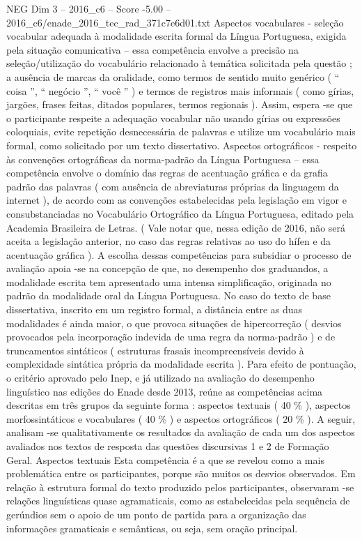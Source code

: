 \begin{textsample}{NEG Dim 3 – 2016\_c6 – Score -5.00 – 2016\_c6/enade\_2016\_tec\_rad\_371c7e6d01.txt}
Aspectos vocabulares - seleção vocabular adequada à modalidade escrita formal da Língua Portuguesa, exigida pela situação comunicativa – essa competência envolve a precisão na seleção/utilização do vocabulário relacionado à temática solicitada pela questão ; a ausência de marcas da oralidade, como termos de sentido muito genérico ( “ coisa ”, “ negócio ”, “ você ” ) e termos de registros mais informais ( como gírias, jargões, frases feitas, ditados populares, termos regionais ).
Assim, espera -se que o participante respeite a adequação vocabular não usando gírias ou expressões coloquiais, evite repetição desnecessária de palavras e utilize um vocabulário mais formal, como solicitado por um texto dissertativo.
Aspectos ortográficos - respeito às convenções ortográficas da norma-padrão da Língua Portuguesa – essa competência envolve o domínio das regras de acentuação gráfica e da grafia padrão das palavras ( com ausência de abreviaturas próprias da linguagem da internet ), de acordo com as convenções estabelecidas pela legislação em vigor e consubstanciadas no Vocabulário Ortográfico da Língua Portuguesa, editado pela Academia Brasileira de Letras. ( Vale notar que, nessa edição de 2016, não será aceita a legislação anterior, no caso das regras relativas ao uso do hífen e da acentuação gráfica ).
A escolha dessas competências para subsidiar o processo de avaliação apoia -se na concepção de que, no desempenho dos graduandos, a modalidade escrita tem apresentado uma intensa simplificação, originada no padrão da modalidade oral da Língua Portuguesa.
No caso do texto de base dissertativa, inscrito em um registro formal, a distância entre as duas modalidades é ainda maior, o que provoca situações de hipercorreção ( desvios provocados pela incorporação indevida de uma regra da norma-padrão ) e de truncamentos sintáticos ( estruturas frasais incompreensíveis devido à complexidade sintática própria da modalidade escrita ).
Para efeito de pontuação, o critério aprovado pelo Inep, e já utilizado na avaliação do desempenho linguístico nas edições do Enade desde 2013, reúne as competências acima descritas em três grupos da seguinte forma : aspectos textuais ( 40 \% ), aspectos morfossintáticos e vocabulares ( 40 \% ) e aspectos ortográficos ( 20 \% ).
A seguir, analisam -se qualitativamente os resultados da avaliação de cada um dos aspectos avaliados nos textos de resposta das questões discursivas 1 e 2 de Formação Geral.
Aspectos textuais Esta competência é a que se revelou como a mais problemática entre os participantes, porque são muitos os desvios observados.
Em relação à estrutura formal do texto produzido pelos participantes, observaram -se relações linguísticas quase agramaticais, como as estabelecidas pela sequência de gerúndios sem o apoio de um ponto de partida para a organização das informações gramaticais e semânticas, ou seja, sem oração principal.

\end{textsample}
